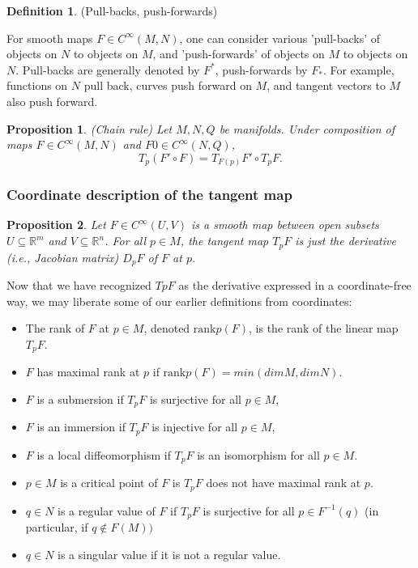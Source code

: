 \documentclass{article}
\newtheorem{proposition}{Proposition}[theorem]
\theoremstyle{definition}
\newtheorem{defn}[theorem]{Definition}
\newenvironment{definition}
  {\vspace{8pt}\begin{mdframed}[backgroundcolor=blueish,innertopmargin=4]\begin{defn}}
  {\end{defn}\end{mdframed}\vspace{4pt}}
\begin{document}
\begin{definition}(Pull-backs, push-forwards)

For smooth maps $F \in C^\infty(M,N)$, one can consider various 'pull-backs' of objects on $N$ to objects on $M$, and 'push-forwards' of objects on $M$ to objects on $N$. Pull-backs are generally denoted by $F^{*}$, push-forwards by $F_{*}$. For example, functions on $N$ pull back, curves push forward on $M$, and tangent vectors to $M$ also push forward.
\end{definition}


\begin{proposition} (Chain rule)
Let $M,N,Q$ be manifolds. Under composition of maps $F \in C^\infty(M,N)$ and $F0 \in C^\infty(N,Q)$,
\[
    T_p(F'\circ F) = T_{F(p)} F' \circ T_pF. 
\]

\end{proposition}

\subsubsection{Coordinate description of the tangent map}
\begin{proposition}

Let $F \in C^\infty(U,V)$ is a smooth map between open subsets $U \subseteq \mathbb R^m $ and $V \subseteq \mathbb R^n$. For all $p \in M$, the tangent map $T_pF$ is just the derivative (i.e., Jacobian matrix) $D_pF$ of $F$ at $p$.
\end{proposition}

Now that we have recognized $TpF$ as the derivative expressed in a coordinate-free way, we may liberate some of our earlier definitions from coordinates:
\begin{itemize}
    \item  The rank of $F$ at $p \in M$, denoted $\text{rank}p(F)$, is the rank of the linear map $T_pF$.
    \item $F$ has maximal rank at $p$ if $\text{rank}p(F) = min(dim M, dim N)$.
    \item $F$ is a submersion if $T_pF$ is surjective for all $p \in M$,
    \item $F$ is an immersion if $T_pF$ is injective for all $p \in M$,
    \item $F$ is a local diffeomorphism if $T_pF$ is an isomorphism for all $p \in M$.
    \item $p \in M$ is a critical point of $F$ is $T_pF$ does not have maximal rank at $p$.
    \item $q \in N$ is a regular value of $F$ if $T_pF$ is surjective for all $p \in F^{-1} (q)$ (in particular, if $q \not\in F(M))$
    \item $q \in N$ is a singular value if it is not a regular value.
\end{itemize}
\end{document}
